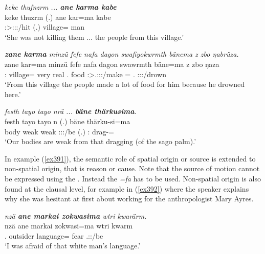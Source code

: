\begin{exe}
	\ex \emph{keke thufnzrm ... \textbf{ane karma kabe}}\\
	\gll keke thuzrm (.) ane kar=ma kabe\\
	\Neg{} \Stsg:\Sbj>\Stpl:\Obj:\Pst:\Dur/hit (.) \Dem{} village=\Char{} man\\
	\trans `She was not killing them ... the people from this village.'\\
	\label{ex419}
\end{exe}
\begin{exe}
	\ex \emph{\textbf{zane karma} minzü fefe nafa dagon swafiyokwrmth bänema z zbo ŋabrüza.}\\
	\gll zane kar=ma minzü fefe nafa dagon swawrmth bäne=ma z zbo ŋaza\\
	\Dem:\Prox{} village=\Char{} very real \Tnsg.\Erg{} food \Stpl:\Sbj>\Tsg.\Masc:\Io:\Pst:\Dur/make \Recog=\Char{} \Iam{} \Prox.\All{} \Sg:\Sbj:\Pst:\Ipfv/drown\\
	\trans `From this village the people made a lot of food for him because he drowned here.'
	\label{ex390}
\end{exe}
\begin{exe}
	\ex \emph{festh tayo tayo nrä ... \textbf{bäne thärkusima}.}\\
	\gll festh tayo tayo n (.) bäne thärku-si=ma\\
	body weak weak \Fpl:\Sbj:\Nonpast:\Ipfv/be (.) \Dem:\Med{} drag-\Nmlz=\Char{}\\
	\trans `Our bodies are weak from that dragging (of the sago palm).'\\
	\label{ex391}
\end{exe}

In example (\ref{ex391}), the semantic role of spatial origin or source is extended to non-spatial origin, that is reason or cause. Note that the source of motion cannot be expressed using the  . Instead the  \emph{=fa} has to be used. Non-spatial origin is also found at the clausal level, for example in (\ref{ex392}) where the speaker explains why she was hesitant at first about working for the anthropologist Mary Ayres.

\begin{exe}
	\ex \emph{nzä \textbf{ane markai zokwasima} wtri kwarärm.}\\
	\gll nzä ane markai zokwasi=ma wtri kwarm\\
	\Fsg.\Abs{} \Dem{} outsider language=\Char{} fear \Fsg.\Sbj:\Pst:\Dur/be\\
	\trans `I was afraid of that white man's language.'
	\label{ex392}
\end{exe}

